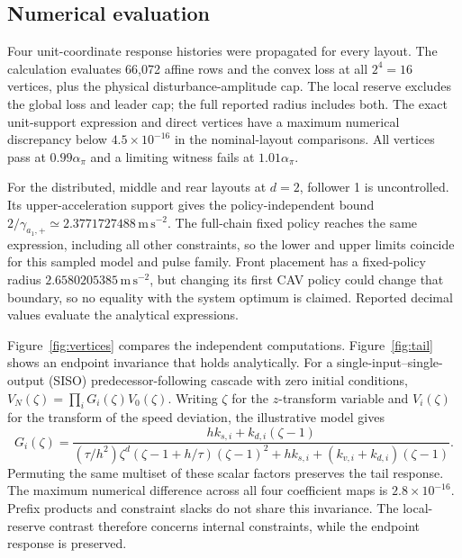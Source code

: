 \documentclass[11pt]{article}
\begin{document}
\subsection*{Numerical evaluation}
Four unit-coordinate response histories were propagated for every layout. The calculation evaluates 66,072 affine rows and the convex loss at all $2^4=16$ vertices, plus the physical disturbance-amplitude cap. The local reserve excludes the global loss and leader cap; the full reported radius includes both. The exact unit-support expression and direct vertices have a maximum numerical discrepancy below $4.5\times10^{-16}$ in the nominal-layout comparisons. All vertices pass at $0.99\alpha_\pi$ and a limiting witness fails at $1.01\alpha_\pi$.

For the distributed, middle and rear layouts at $d=2$, follower 1 is uncontrolled. Its upper-acceleration support gives the policy-independent bound $2/\gamma_{a_1,+}\simeq2.3771727488\,\mathrm{m\,s^{-2}}$. The full-chain fixed policy reaches the same expression, including all other constraints, so the lower and upper limits coincide for this sampled model and pulse family. Front placement has a fixed-policy radius $2.6580205385\,\mathrm{m\,s^{-2}}$, but changing its first CAV policy could change that boundary, so no equality with the system optimum is claimed. Reported decimal values evaluate the analytical expressions.

Figure~\ref{fig:vertices} compares the independent computations. Figure~\ref{fig:tail} shows an endpoint invariance that holds analytically. For a single-input--single-output (SISO) predecessor-following cascade with zero initial conditions, $V_N(\zeta)=\prod_iG_i(\zeta)V_0(\zeta)$. Writing $\zeta$ for the $z$-transform variable and $V_i(\zeta)$ for the transform of the speed deviation, the illustrative model gives
\begin{equation}
G_i(\zeta)=\frac{hk_{s,i}+k_{d,i}(\zeta-1)}{
(\tau/h^2)\zeta^d(\zeta-1+h/\tau)(\zeta-1)^2+hk_{s,i}+(k_{v,i}+k_{d,i})(\zeta-1)}.
\end{equation}
Permuting the same multiset of these scalar factors preserves the tail response. The maximum numerical difference across all four coefficient maps is $2.8\times10^{-16}$. Prefix products and constraint slacks do not share this invariance. The local-reserve contrast therefore concerns internal constraints, while the endpoint response is preserved.
\end{document}
